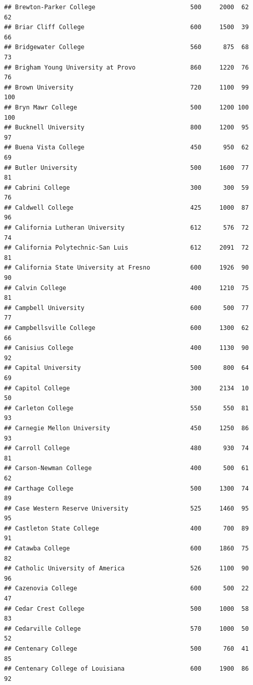 \documentclass[
]{article}
\begin{document}
\begin{verbatim}
## Brewton-Parker College                          500     2000  62       62
## Briar Cliff College                             600     1500  39       66
## Bridgewater College                             560      875  68       73
## Brigham Young University at Provo               860     1220  76       76
## Brown University                                720     1100  99      100
## Bryn Mawr College                               500     1200 100      100
## Bucknell University                             800     1200  95       97
## Buena Vista College                             450      950  62       69
## Butler University                               500     1600  77       81
## Cabrini College                                 300      300  59       76
## Caldwell College                                425     1000  87       96
## California Lutheran University                  612      576  72       74
## California Polytechnic-San Luis                 612     2091  72       81
## California State University at Fresno           600     1926  90       90
## Calvin College                                  400     1210  75       81
## Campbell University                             600      500  77       77
## Campbellsville College                          600     1300  62       66
## Canisius College                                400     1130  90       92
## Capital University                              500      800  64       69
## Capitol College                                 300     2134  10       50
## Carleton College                                550      550  81       93
## Carnegie Mellon University                      450     1250  86       93
## Carroll College                                 480      930  74       81
## Carson-Newman College                           400      500  61       62
## Carthage College                                500     1300  74       89
## Case Western Reserve University                 525     1460  95       95
## Castleton State College                         400      700  89       91
## Catawba College                                 600     1860  75       82
## Catholic University of America                  526     1100  90       96
## Cazenovia College                               600      500  22       47
## Cedar Crest College                             500     1000  58       83
## Cedarville College                              570     1000  50       52
## Centenary College                               500      760  41       85
## Centenary College of Louisiana                  600     1900  86       92

\end{verbatim}
\end{document}
